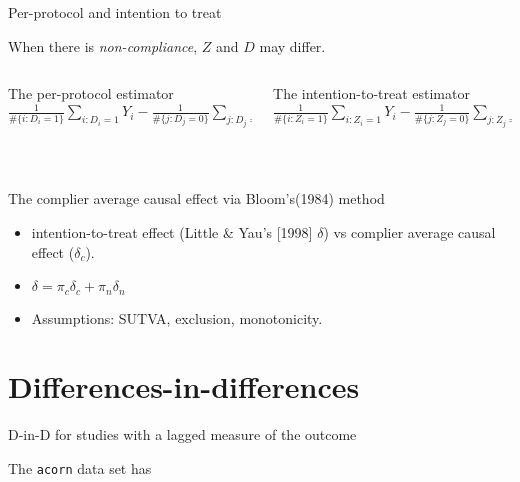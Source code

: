 \begin{frame}{Per-protocol and intention to treat}

When there is \textit{non-compliance}, $Z$ and $D$ may differ.  \pause  

  \begin{columns}
    \begin{Column}
  { The per-protocol estimator} \\      
$\frac{1}{\# \{i: D_i = 1\}} \sum_{i:D_i=1} Y_i - \frac{1}{\# \{j: D_j = 0\}} \sum_{j:D_j=0} Y_j$
\bigskip

\vspace{.5\textheight} 
\mbox{ }

    \end{Column}
    \begin{Column}
  { The intention-to-treat estimator} \\      
$\frac{1}{\# \{i: Z_i = 1\}} \sum_{i:Z_i=1} Y_i - \frac{1}{\# \{j: Z_j = 0\}} \sum_{j:Z_j=0} Y_j$
\bigskip


\vspace{.5\textheight} 
\mbox{ }
    \end{Column}

  \end{columns}
\end{frame}

\begin{frame}{The complier average causal effect via Bloom's(1984) method}
  \begin{itemize}
  \item intention-to-treat effect (Little \& Yau's [1998] $\delta$) vs
    complier average causal effect ($\delta_{c}$).
  \item $\delta = \pi_{c} \delta_{c} + \pi_{n} \delta_{n} $
  \item Assumptions: SUTVA, exclusion, monotonicity.
 \end{itemize}

\end{frame}




\section{Differences-in-differences}

\begin{frame}{D-in-D for studies with a lagged measure of the outcome}

The \texttt{acorn} data set has

  

\end{frame}

